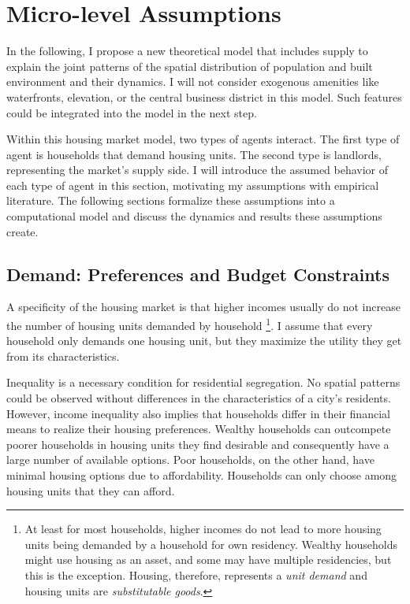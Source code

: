 \section{Micro-level Assumptions}

In the following, I propose a new theoretical model that includes supply to explain the joint patterns of the spatial distribution of population and built environment and their dynamics. I will not consider exogenous amenities like waterfronts, elevation, or the central business district in this model. Such features could be integrated into the model in the next step.

Within this housing market model, two types of agents interact. The first type of agent is households that demand housing units. The second type is landlords, representing the market's supply side. I will introduce the assumed behavior of each type of agent in this section, motivating my assumptions with empirical literature. The following sections formalize these assumptions into a computational model and discuss the dynamics and results these assumptions create. 


\subsection{Demand: Preferences and Budget Constraints}

A specificity of the housing market is that higher incomes usually do not increase the number of housing units demanded by household \citep[353]{glaeserUrbanDeclineDurable2005}\footnote{At least for most households, higher incomes do not lead to more housing units being demanded by a household for own residency. Wealthy households might use housing as an asset, and some may have multiple residencies, but this is the exception. Housing, therefore, represents a \textit{unit demand} and housing units are \textit{substitutable goods}.}. I assume that every household only demands one housing unit, but they maximize the utility they get from its characteristics.

Inequality is a necessary condition for residential segregation. No spatial patterns could be observed without differences in the characteristics of a city's residents. However, income inequality also implies that households differ in their financial means to realize their housing preferences. Wealthy households can outcompete poorer households in housing units they find desirable and consequently have a large number of available options. Poor households, on the other hand, have minimal housing options due to affordability. Households can only choose among housing units that they can afford.

